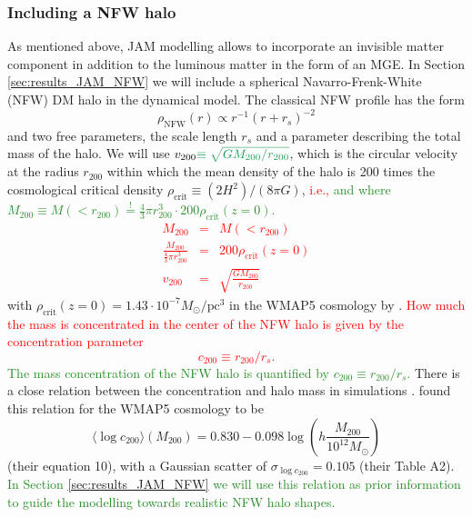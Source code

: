 \documentclass[useAMS,usenatbib]{mnras}
\newcommand{\NEW}[1]{\textcolor{ForestGreen}{#1}}
\newcommand{\OLD}[1]{\textcolor{Red}{#1}}
\begin{document}
\subsubsection{Including a NFW halo} \label{sec:model_JAM_NFW}

As mentioned above, JAM modelling allows to incorporate an invisible matter component in addition to the luminous matter in the form of an MGE. In Section \ref{sec:results_JAM_NFW} we will include a spherical Navarro-Frenk-White (NFW) DM halo \citep{1996ApJ...462..563N} in the dynamical model. The classical NFW profile has the form
\begin{equation}
\rho_\text{NFW}(r) \propto r^{-1} \left( r+r_s \right)^{-2} \label{eq:NFWprofile}
\end{equation}
and two free parameters, the scale length $r_s$ and a parameter describing the total mass of the halo. We will use $v_\text{200}\NEW{\equiv \sqrt{GM_{200}/r_{200}}}$, which is the circular velocity at the radius $r_\text{200}$ within which the mean density of the halo is 200 times the cosmological critical density $\rho_\text{crit} \equiv (2H^2)/(8\pi G)$, \OLD{i.e.,}\NEW{ and where $M_{200} \equiv M(<r_{200}) \stackrel{!}{=} \frac 43 \pi r_{200}^3 \cdot 200\rho_\text{crit}(z=0)$.}
\OLD{\begin{eqnarray*}
M_\text{200} &=& M(<r_{200})\\
\frac{M_{200}}{ \frac 43 \pi r_{200}^3} &=& 200 \rho_\text{crit}(z=0) \\
v_\text{200} &=& \sqrt{\frac{GM_{200}}{r_\text{200}}}
\end{eqnarray*}}
with $\rho_\text{crit}(z=0)=1.43 \cdot 10^{-7} M_\odot / \text{pc}^3$ in the WMAP5 cosmology by \citet{WMAP5cosm}. \OLD{How much the mass is concentrated in the center of the NFW halo is given by the concentration parameter
\begin{equation}
c_{200}\equiv r_{200} / r_s. \label{eq:NFW_c}
\end{equation}}
\NEW{The mass concentration of the NFW halo is quantified by $c_{200}\equiv r_{200} / r_s$.}
There is a close relation between the concentration and halo mass in simulations \citep{1996ApJ...462..563N}. \citet{Maccio08} found this relation for the WMAP5 cosmology to be
\begin{equation}
\langle \log c_{200} \rangle (M_{200}) = 0.830 - 0.098 \log \left(h \frac{M_{200}}{10^{12} M_\odot} \right) \label{eq:Maccio08}
\end{equation}
(their equation 10), with a Gaussian scatter of $\sigma_{\log c_{200}} = 0.105$ (their Table A2). \NEW{In Section \ref{sec:results_JAM_NFW} we will use this relation as prior information to guide the modelling towards realistic NFW halo shapes.}
\end{document}
